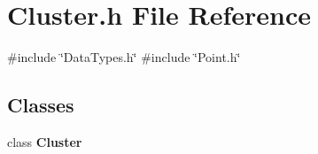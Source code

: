 \section{Cluster.\+h File Reference}
\label{_cluster_8h}
{\ttfamily \#include \char`\"{}Data\+Types.\+h\char`\"{}}\newline
{\ttfamily \#include \char`\"{}Point.\+h\char`\"{}}\newline
\subsection*{Classes}
\begin{DoxyCompactItemize}
\item 
class \textbf{ Cluster}
\end{DoxyCompactItemize}
